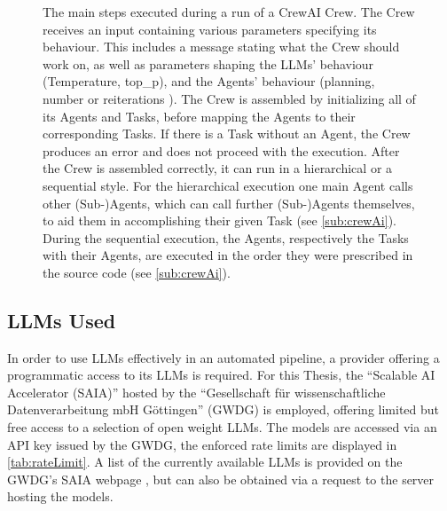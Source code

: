 \documentclass[
	fontsize = 11pt,
	paper = a4,
	draft = false,
	twoside = true,
	titlepage = false
]{scrartcl}
\numberwithin{equation}{subsection}
\newcommand{\figentry}[1]{%
	\addcontentsline{fig}{figidx}{#1}%
}
\begin{document}
\begin{figure}[ht]
		\caption{The main steps executed during a run of a CrewAI Crew. The Crew receives an input containing various parameters specifying its behaviour. This includes a message stating what the Crew should work on, as well as parameters shaping the \gls{LLM}s' behaviour (Temperature, top\_p), and the \gls{Agent}s' behaviour (planning, number or reiterations \autocite{agentCore}). The Crew is assembled by initializing all of its \glspl{Agent} and Tasks, before mapping the \glspl{Agent} to their corresponding Tasks. If there is a Task without an \gls{Agent}, the Crew produces an error and does not proceed with the execution. After the Crew is assembled correctly, it can run in a hierarchical or a sequential style. For the hierarchical execution one main \gls{Agent} calls other (Sub-)\glspl{Agent}, which can call further (Sub-)\glspl{Agent} themselves, to aid them in accomplishing their given Task (see \autoref{sub:crewAi}). During the sequential execution, the \glspl{Agent}, respectively the Tasks with their \glspl{Agent}, are executed in the order they were prescribed in the source code (see \autoref{sub:crewAi}).}
		\label{fig:crewExe}
		\figentry{CrewAI Execution Paths}
	\end{figure}
	
	\subsection{\gls{LLM}s Used} \label{sub:LlmUsed}
	In order to use \gls{LLM}s effectively in an automated pipeline, a provider offering a programmatic access to its \gls{LLM}s is required. For this Thesis, the \enquote{Scalable AI Accelerator (SAIA)} \autocite{saiaDoc} hosted by the \enquote{Gesellschaft für wissenschaftliche Datenverarbeitung mbH Göttingen} (GWDG) \autocite{gwdg} is employed, offering limited but free access to a selection of open weight \gls{LLM}s. The models are accessed via an \gls{API key} issued by the GWDG, the enforced rate limits are displayed in \autoref{tab:rateLimit}. A list of the currently available \gls{LLM}s is provided on the GWDG's SAIA webpage \autocite{saiaModels}, but can also be obtained via a request to the server hosting the models.
	
\end{document}
